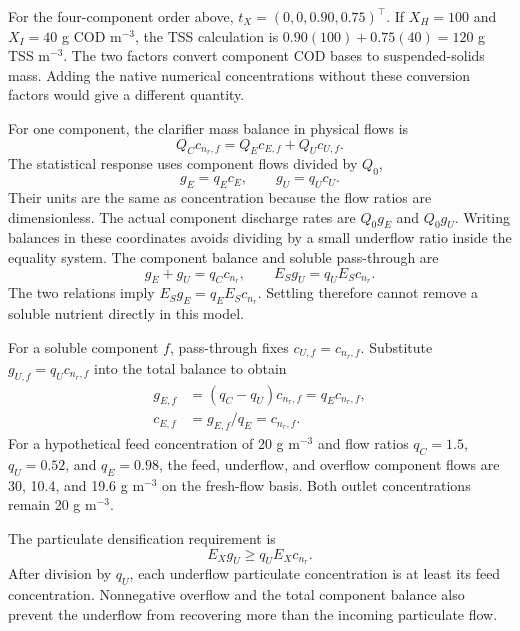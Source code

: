 For the four-component order above, $t_X=(0,0,0.90,0.75)^\top$. If $X_H=100$ and $X_I=40$ g COD m$^{-3}$, the TSS calculation is $0.90(100)+0.75(40)=120$ g TSS m$^{-3}$. The two factors convert component COD bases to suspended-solids mass. Adding the native numerical concentrations without these conversion factors would give a different quantity.

For one component, the clarifier mass balance in physical flows is
\begin{equation}
Q_Cc_{n_r,f}=Q_Ec_{E,f}+Q_Uc_{U,f}.
\end{equation}
The statistical response uses component flows divided by $Q_0$,
\begin{equation}
g_E=q_Ec_E,\qquad g_U=q_Uc_U.
\label{eq:plant_outlet_flows}
\end{equation}
Their units are the same as concentration because the flow ratios are dimensionless. The actual component discharge rates are $Q_0g_E$ and $Q_0g_U$. Writing balances in these coordinates avoids dividing by a small underflow ratio inside the equality system. The component balance and soluble pass-through are
\begin{equation}
g_E+g_U=q_Cc_{n_r},\qquad
E_Sg_U=q_UE_Sc_{n_r}.
\label{eq:plant_clarifier_equalities}
\end{equation}
The two relations imply $E_Sg_E=q_EE_Sc_{n_r}$. Settling therefore cannot remove a soluble nutrient directly in this model.

For a soluble component $f$, pass-through fixes $c_{U,f}=c_{n_r,f}$. Substitute $g_{U,f}=q_Uc_{n_r,f}$ into the total balance to obtain
\begin{align}
g_{E,f}&=(q_C-q_U)c_{n_r,f}=q_Ec_{n_r,f},\\
c_{E,f}&=g_{E,f}/q_E=c_{n_r,f}.
\end{align}
For a hypothetical feed concentration of 20 g m$^{-3}$ and flow ratios $q_C=1.5$, $q_U=0.52$, and $q_E=0.98$, the feed, underflow, and overflow component flows are 30, 10.4, and 19.6 g m$^{-3}$ on the fresh-flow basis. Both outlet concentrations remain 20 g m$^{-3}$.

The particulate densification requirement is
\begin{equation}
E_Xg_U\ge q_UE_Xc_{n_r}.
\label{eq:plant_densification}
\end{equation}
After division by $q_U$, each underflow particulate concentration is at least its feed concentration. Nonnegative overflow and the total component balance also prevent the underflow from recovering more than the incoming particulate flow.

